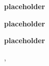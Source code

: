 \begin{bio}
  {\bfseries placeholder}

  {\bfseries placeholder}

  {\bfseries placeholder}
\end{bio}

\begin{tutorial}
  {}
  {}
  {\daydateyear, \tutorialafternoontime}
  {\TutLocE}



\end{tutorial}
